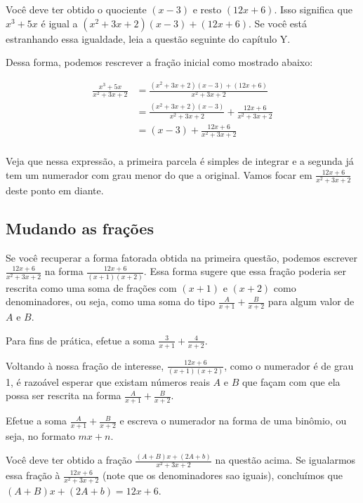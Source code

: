 \documentclass[main_estudante.tex]{subfiles}
\begin{document}
Você deve ter obtido o quociente $(x-3)$ e resto $(12x+6)$. Isso significa que ${x^3+5x}$ é igual a $(x^2+3x+2)(x-3)+(12x+6)$. Se você está estranhando essa igualdade, leia a questão seguinte do capítulo Y. 

Dessa forma, podemos rescrever a fração inicial como mostrado abaixo:

\begin{align*}
\frac{x^3+5x}{x^2+3x+2} &= \frac{(x^2+3x+2)(x-3)+(12x+6)}{x^2+3x+2} \\
&=\frac{(x^2+3x+2)(x-3)}{x^2+3x+2}+\frac{12x+6}{x^2+3x+2} \\
&=(x-3)+\frac{12x+6}{x^2+3x+2} \\
\end{align*}

Veja que nessa expressão, a primeira parcela é simples de integrar e a segunda já tem um numerador com grau menor do que a original. Vamos focar em $\frac{12x+6}{x^2+3x+2}$ deste ponto em diante.

\subsection*{Mudando as frações}

Se você recuperar a forma fatorada obtida na primeira questão, podemos escrever $\frac{12x+6}{x^2+3x+2}$ na forma $\frac{12x+6}{(x+1)(x+2)}$. Essa forma sugere que essa fração poderia ser rescrita como uma soma de frações com $(x+1)$ e $(x+2)$ como denominadores, ou seja, como uma soma do tipo $\frac{A}{x+1}+\frac{B}{x+2}$ para algum valor de $A$ e $B$.

\begin{questao}
Para fins de prática, efetue a soma $\frac{3}{x+1}+\frac{4}{x+2}$.
\end{questao}

Voltando à nossa fração de interesse, $\frac{12x+6}{(x+1)(x+2)}$, como o numerador é de grau 1, é razoável esperar que existam números reais $A$ e $B$ que façam com que ela possa ser rescrita na forma $\frac{A}{x+1}+\frac{B}{x+2}$.

\begin{questao}
Efetue a soma $\frac{A}{x+1}+\frac{B}{x+2}$ e escreva o numerador na forma de uma binômio, ou seja, no formato $mx+n$.
\end{questao}

Você deve ter obtido a fração $\frac{(A+B)x+(2A+b)}{x^2+3x+2}$ na questão acima. Se igualarmos essa fração à $\frac{12x+6}{x^2+3x+2}$ (note que os denominadores sao iguais), concluímos que $(A+B)x+(2A+b)=12x+6$.
\end{document}
